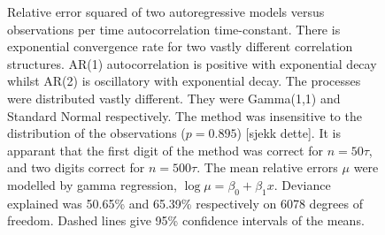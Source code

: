 \documentclass[11pt,english,a4paper]{article}
\begin{document}
\begin{figure}[!htbp]
  
	
  	\caption{Relative error squared of two autoregressive models versus observations per time autocorrelation time-constant. There is exponential convergence rate for two vastly different correlation structures. AR(1) autocorrelation is positive with exponential decay whilst AR(2) is oscillatory with exponential decay. The processes were distributed vastly different. They were Gamma(1,1) and Standard Normal respectively. The method was insensitive to the distribution of the observations ($p = 0.895$) [sjekk dette]. It is apparant that the first digit of the method was correct for $n = 50\tau$, and two digits correct for $n = 500\tau$. The mean relative errors $\mu$ were modelled by gamma regression, $\log \mu = \beta_0 + \beta_1 x$. Deviance explained was 50.65\% and 65.39\% respectively on 6078 degrees of freedom. Dashed lines give 95\% confidence intervals of the means.} \label{fig:figure1}
 
\end{figure}
\end{document}
